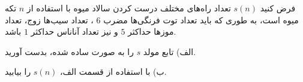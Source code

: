 \EXERCISE
فرض کنید 
$s(n)$
 تعداد راه‌های مختلف درست کردن سالاد میوه با استفاده از 
$n$
  تکه میوه است، به طوری که باید تعداد توت فرنگی‌ها مضرب 
$6$
  ، تعداد سیب‌ها زوج، تعداد موزها حداکثر 
$5$
   و نیز تعداد آناناس حداکثر 
$1$
    باشد.
    
    الف) تابع مولد 
$s$
     را به صورت ساده شده، بدست آورید. 
     
     ب) با استفاده از قسمت الف،
$s(n)$
      را بیابید.
